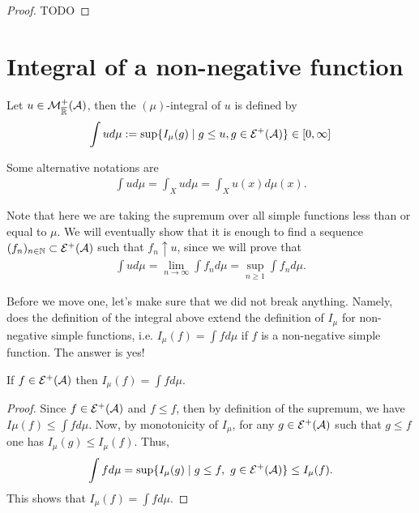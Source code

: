 \begin{proof}
	TODO
\end{proof}

\section{Integral of a non-negative function}

\begin{dfn}
	Let $u \in \mathcal{M}^+_{\overline{\mathbb{R}}}(\mathcal{A})$, then the $(\mu)$-integral of $u$ is defined by
	\begin{align}
		\int u d\mu := \sup \{ I_\mu(g) \mid g \leq u, g \in \mathcal{E}^+(\mathcal{A})\} \in [0, \infty]
	\end{align}
\end{dfn}

Some alternative notations are
\begin{align*}
	\int u d\mu = \int_X u d\mu = \int_X u(x) d\mu(x).
\end{align*}

Note that here we are taking the supremum over all simple functions less than or equal to $\mu$. We will eventually show that it is enough to find a sequence $(f_n)_{n\in\mathbb{N}} \subset \mathcal{E}^+(\mathcal{A})$ such that $f_n \uparrow u$, since we will prove that
\begin{align*}
	\int u d\mu = \lim_{n\to \infty} \int f_n d\mu = \sup_{n \geq 1} \int f_n d\mu.
\end{align*}

Before we move one, let's make sure that we did not break anything. Namely, does the definition of the integral above extend the definition of $I_\mu$ for non-negative simple functions, i.e. $I_\mu(f) = \int f d\mu$ if $f$ is a non-negative simple function. The answer is yes!

\begin{lem}
	\label{lem:def-integral-simple}
	If $f \in \mathcal{E}^+(\mathcal{A})$ then $I_\mu(f) = \int f d\mu$.
\end{lem}

\begin{proof}
	Since $f \in \mathcal{E}^+(\mathcal{A})$ and $f \leq f$, then by definition of the supremum, we have $I\mu(f) \leq \int f d\mu$. Now, by monotonicity of $I_\mu$, for any $g \in \mathcal{E}^+(\mathcal{A})$ such that $g \leq f$ one has $I_\mu(g) \leq I_\mu(f)$. Thus,
	\begin{align*}
		\int f d\mu = \sup \{ I_\mu(g) \mid g \leq f,\ g \in \mathcal{E}^+(\mathcal{A})\} \leq I_\mu(f).
	\end{align*}
	This shows that $I_\mu(f) = \int f d\mu$.
\end{proof}

